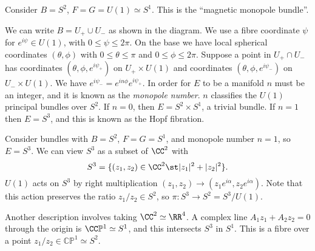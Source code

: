\documentclass{jknotes}
\begin{document}
\begin{eg}
    Consider \(B=S^2\), \(F=G=U(1)\simeq S^1\). This is the ``magnetic monopole bundle''.
    \begin{figure}[H]
        \centering
    \end{figure}
    We can write \(B=U_+ \cup U_-\) as shown in the diagram. We use a fibre coordinate \(\psi\) for \(e^{i\psi}\in U(1)\), with \(0\le\psi\le2\pi\). On the base we have local spherical coordinates \((\theta,\phi)\) with \(0\le\theta\le\pi\) and \(0\le\phi\le2\pi\).
    Suppose a point in \(U_+\cap U_-\) has coordinates \((\theta,\phi,e^{i\psi_+})\) on \(U_+\times U(1)\) and coordinates \((\theta,\phi,e^{i\psi_-})\) on \(U_-\times U(1)\). We have \(e^{i\psi_-} = e^{in\phi}e^{i\psi_+}\). In order for \(E\) to be a manifold \(n\) must be an integer, and it is known as the \emph{monopole number}. \(n\) classifies the \(U(1)\) principal bundles over \(S^2\). If \(n=0\), then \(E=S^2\times S^1\), a trivial bundle. If \(n=1\) then \(E=S^3\), and this is known as the Hopf fibration.
\end{eg}


\begin{eg}
    Consider bundles with \(B=S^2\), \(F=G=S^1\), and monopole number \(n=1\), so \(E=S^3\). We can view \(S^3\) as a subset of \(\CC^2\) with
    \begin{equation}
        S^3 = \{(z_1,z_2)\in \CC^2 \st |z_1|^2 + |z_2|^2\}.
    \end{equation}
    \(U(1)\) acts on \(S^3\) by right multiplication \((z_1,z_2) \to (z_1e^{i\alpha},z_2e^{i\alpha})\). Note that this action preserves the ratio \(z_1/z_2 \in S^2\), so \(\pi:S^3\to S^2=S^3/U(1)\).

    Another description involves taking \(\CC^2\simeq\RR^4\). A complex line \(A_1z_1 + A_2z_2=0\) through the origin is \(\CC\mathbb{P}^1 \simeq S^1\), and this intersects \(S^3\) in \(S^1\). This is a fibre over a point \(z_1/z_2 \in \mathbb{CP}^1\simeq S^2\).
\end{eg}
\end{document}
